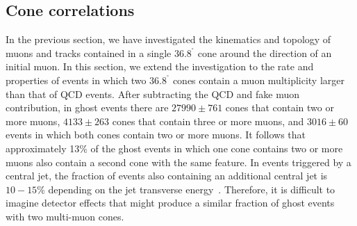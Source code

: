 \documentclass[aps,prd,preprint,floatfix,nofootinbib,superscriptaddress,showpacs,amssymb]{revtex4}
\def\deg{^\circ}
\begin{document}
\subsection{Cone correlations}
\label{sec:ss-cone}
 In the previous section, we have investigated the kinematics and topology
 of muons and tracks contained in a single $36.8^{\deg} $ cone around the
 direction of an initial muon. In this section, we extend the investigation
 to the rate and properties of events in which two $36.8^{\deg}$ cones
 contain a muon multiplicity larger than that of QCD events. After
 subtracting the QCD and fake muon contribution, in ghost events there are
 $27990\pm761$ cones that contain two or more muons, $4133 \pm 263$ cones
 that contain three or more muons, and $3016 \pm 60$ events in which both
 cones contain two or more muons. It follows that approximately 13\% of the
 ghost events in which one cone contains two or more muons also contain a
 second cone with the same feature. In events triggered by a central jet,
 the fraction of events also containing an additional central jet is
 $10-15$\% depending on the jet transverse energy~\cite{dijet}. Therefore,
 it is difficult to imagine detector effects that might produce a similar
 fraction of ghost events with two multi-muon cones.
 
\end{document}
